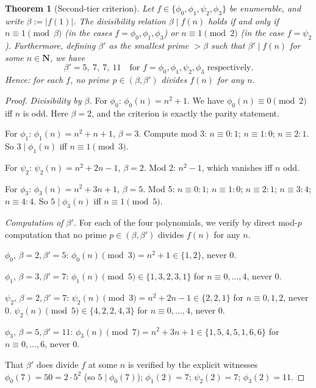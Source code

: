 \documentclass[11pt]{article}
\newtheorem{theorem}{Theorem}[section]
\theoremstyle{definition}
\newcommand{\N}{\mathbf{N}}
\begin{document}
\begin{theorem}[Second-tier criterion]\label{thm:second-tier}
Let $f \in \{\phi_0, \phi_1, \psi_2, \phi_3\}$ be enumerable, and write $\beta := |f(1)|$. The divisibility relation $\beta \mid f(n)$ holds if and only if $n \equiv 1 \pmod \beta$ (in the cases $f = \phi_0, \phi_1, \phi_3$) or $n \equiv 1 \pmod 2$ (in the case $f = \psi_2$). Furthermore, defining $\beta'$ as the smallest prime $> \beta$ such that $\beta' \mid f(n)$ for some $n \in \N$, we have
\[
\beta' = 5,\ 7,\ 7,\ 11 \quad \text{for } f = \phi_0,\phi_1,\psi_2,\phi_3 \text{ respectively}.
\]
Hence: for each $f$, no prime $p \in (\beta, \beta')$ divides $f(n)$ for any $n$.
\end{theorem}

\begin{proof}
\emph{Divisibility by $\beta$.}
For $\phi_0$: $\phi_0(n) = n^2+1$. We have $\phi_0(n) \equiv 0 \pmod 2$ iff $n$ is odd. Here $\beta = 2$, and the criterion is exactly the parity statement.

For $\phi_1$: $\phi_1(n) = n^2+n+1$, $\beta = 3$. Compute mod 3: $n \equiv 0: 1$; $n \equiv 1: 0$; $n \equiv 2: 1$. So $3 \mid \phi_1(n)$ iff $n \equiv 1 \pmod 3$.

For $\psi_2$: $\psi_2(n) = n^2+2n-1$, $\beta = 2$. Mod 2: $n^2 - 1$, which vanishes iff $n$ odd.

For $\phi_3$: $\phi_3(n) = n^2+3n+1$, $\beta = 5$. Mod 5: $n \equiv 0: 1$; $n \equiv 1: 0$; $n \equiv 2: 1$; $n \equiv 3: 4$; $n \equiv 4: 4$. So $5 \mid \phi_3(n)$ iff $n \equiv 1 \pmod 5$.

\emph{Computation of $\beta'$.}
For each of the four polynomials, we verify by direct mod-$p$ computation that no prime $p \in (\beta, \beta')$ divides $f(n)$ for any $n$.

$\phi_0$, $\beta=2,\beta'=5$: $\phi_0(n) \pmod 3 = n^2+1 \in \{1, 2\}$, never $0$.

$\phi_1$, $\beta=3, \beta'=7$: $\phi_1(n) \pmod 5 \in \{1, 3, 2, 3, 1\}$ for $n \equiv 0,\ldots,4$, never $0$.

$\psi_2$, $\beta=2,\beta'=7$: $\psi_2(n) \pmod 3 = n^2+2n-1 \in \{2, 2, 1\}$ for $n \equiv 0,1,2$, never $0$. $\psi_2(n) \pmod 5 \in \{4, 2, 2, 4, 3\}$ for $n \equiv 0,\ldots,4$, never $0$.

$\phi_3$, $\beta=5, \beta'=11$: $\phi_3(n) \pmod 7 = n^2+3n+1 \in \{1, 5, 4, 5, 1, 6, 6\}$ for $n \equiv 0,\ldots,6$, never $0$.

That $\beta'$ does divide $f$ at some $n$ is verified by the explicit witnesses $\phi_0(7) = 50 = 2 \cdot 5^2$ (so $5 \mid \phi_0(7)$); $\phi_1(2) = 7$; $\psi_2(2) = 7$; $\phi_3(2) = 11$.
\end{proof}
\end{document}
